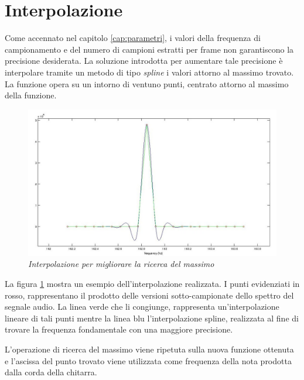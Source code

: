 \section{Interpolazione}\label{cap:interpolazione}

Come accennato nel capitolo \ref{cap:parametri}, i valori della frequenza di campionamento e del numero di campioni estratti per frame non garantiscono la precisione desiderata.
La soluzione introdotta per aumentare tale precisione è interpolare tramite un metodo di tipo \emph{spline} i valori attorno al massimo trovato.
La funzione opera su un intorno di ventuno punti, centrato attorno al massimo della funzione.

	\begin{figure}[h]
	  \begin{center} 
	    \includegraphics[width=\textwidth*\real{0.9}]{images/ch_05/interpolazione.jpg}
	  \end{center} 
	  \caption{\textit{Interpolazione per migliorare la ricerca del massimo}}  
	  \label{fig:interpolazione}
	\end{figure}

La figura \ref{fig:interpolazione} mostra un esempio dell'interpolazione realizzata. 
I punti evidenziati in rosso, rappresentano il prodotto delle versioni sotto-campionate dello spettro del segnale audio.
La linea verde che li congiunge, rappresenta un'interpolazione lineare di tali punti mentre la linea blu l'interpolazione spline, realizzata al fine di trovare la frequenza fondamentale con una maggiore precisione.

L'operazione di ricerca del massimo viene ripetuta sulla nuova funzione ottenuta e l'ascissa del punto trovato viene utilizzata come frequenza della nota prodotta dalla corda della chitarra.

